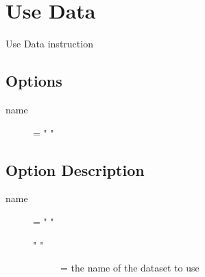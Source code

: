 \section{Use Data}

Use Data instruction

\subsection{Options}
\begin{description}
\item[name] = " "
\end{description}

\subsection{Option Description}
\begin{description}
\item[name] = " "
	\begin{description}
	\item[" "] = the name of the dataset to use
	\end{description}
\end{description} 